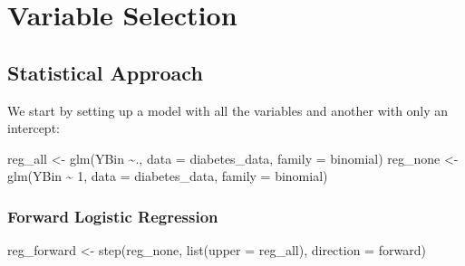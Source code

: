 \documentclass[
]{article}
\newenvironment{Shaded}{\begin{snugshade}}{\end{snugshade}}
\newcommand{\AttributeTok}[1]{\textcolor[rgb]{0.77,0.63,0.00}{#1}}
\newcommand{\DecValTok}[1]{\textcolor[rgb]{0.00,0.00,0.81}{#1}}
\newcommand{\FunctionTok}[1]{\textcolor[rgb]{0.00,0.00,0.00}{#1}}
\newcommand{\NormalTok}[1]{#1}
\newcommand{\OtherTok}[1]{\textcolor[rgb]{0.56,0.35,0.01}{#1}}
\newcommand{\SpecialCharTok}[1]{\textcolor[rgb]{0.00,0.00,0.00}{#1}}
\newcommand{\StringTok}[1]{\textcolor[rgb]{0.31,0.60,0.02}{#1}}
\begin{document}
\hypertarget{variable-selection}{%
\section{Variable Selection}\label{variable-selection}}

\hypertarget{statistical-approach}{%
\subsection{Statistical Approach}\label{statistical-approach}}

We start by setting up a model with all the variables and another with
only an intercept:

\begin{Shaded}
\begin{Highlighting}[]
\NormalTok{reg\_all }\OtherTok{\textless{}{-}} \FunctionTok{glm}\NormalTok{(YBin }\SpecialCharTok{\textasciitilde{}}\NormalTok{., }\AttributeTok{data =}\NormalTok{ diabetes\_data, }\AttributeTok{family =}\NormalTok{ binomial)}
\NormalTok{reg\_none }\OtherTok{\textless{}{-}} \FunctionTok{glm}\NormalTok{(YBin }\SpecialCharTok{\textasciitilde{}} \DecValTok{1}\NormalTok{, }\AttributeTok{data =}\NormalTok{ diabetes\_data, }\AttributeTok{family =}\NormalTok{ binomial)}
\end{Highlighting}
\end{Shaded}

\hypertarget{forward-logistic-regression}{%
\subsubsection{Forward Logistic
Regression}\label{forward-logistic-regression}}

\begin{Shaded}
\begin{Highlighting}[]
\NormalTok{reg\_forward }\OtherTok{\textless{}{-}} \FunctionTok{step}\NormalTok{(reg\_none, }\FunctionTok{list}\NormalTok{(}\AttributeTok{upper =}\NormalTok{ reg\_all), }\AttributeTok{direction =} \StringTok{\textquotesingle{}forward\textquotesingle{}}\NormalTok{)}
\end{Highlighting}
\end{Shaded}
\end{document}
